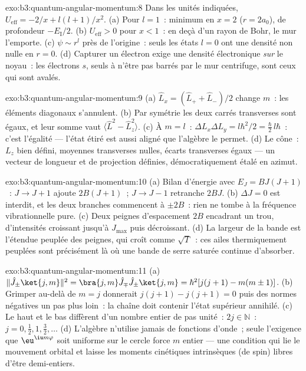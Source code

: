 \begin{solution}{exo:b3:quantum-angular-momentum:8}
Dans les unités indiquées, $U_{\text{eff}} = -2/x + l(l+1)/x^2$. (a)
Pour $l = 1$~: minimum en $x = 2$ ($r = 2a_0$), de profondeur
$-E_{\text{I}}/2$. (b) $U_{\text{eff}} > 0$ pour $x < 1$~: en deçà
d'un rayon de Bohr, le mur l'emporte. (c) $\psi \sim r^l$ près de
l'origine~: seuls les états $l = 0$ ont une densité non nulle en
$r = 0$. (d) Capturer un électron exige une densité électronique
\emph{sur} le noyau~: les électrons $s$, seuls à n'être pas barrés par
le mur centrifuge, sont ceux qui sont avalés.
\end{solution}

\begin{solution}{exo:b3:quantum-angular-momentum:9}
(a) $\hat L_x = (\hat L_+ + \hat L_-)/2$ change $m$~: les éléments
diagonaux s'annulent. (b) Par symétrie les deux carrés transverses
sont égaux, et leur somme vaut $\langle\hat L^2 - \hat L_z^2\rangle$.
(c) À $m = l$~: $\Delta L_x\Delta L_y = l\hbar^2/2 = \tfrac\hbar2
\,l\hbar$~: c'est l'égalité --- l'état étiré est aussi aligné que
l'algèbre le permet. (d) Le cône~: $L_z$ bien défini, moyennes
transverses nulles, écarts transverses égaux --- un vecteur de
longueur et de projection définies, démocratiquement étalé en azimut.
\end{solution}

\begin{solution}{exo:b3:quantum-angular-momentum:10}
(a) Bilan d'énergie avec $E_J = BJ(J+1)$~: $J \to J + 1$ ajoute
$2B(J+1)$~; $J \to J - 1$ retranche $2BJ$. (b) $\Delta J = 0$ est
interdit, et les deux branches commencent à $\pm 2B$~: rien ne tombe
à la fréquence vibrationnelle pure. (c) Deux peignes d'espacement $2B$
encadrant un trou, d'intensités croissant jusqu'à $J_{\max}$ puis
décroissant. (d) La largeur de la bande est l'étendue peuplée des
peignes, qui croît comme $\sqrt{T}$~: ces ailes thermiquement peuplées
sont précisément là où une bande de serre saturée continue d'absorber.
\end{solution}

\begin{solution}{exo:b3:quantum-angular-momentum:11}
(a) $\|\hat J_\pm\ket{j,m}\|^2 = \bra{j,m}\hat J_\mp\hat J_\pm
\ket{j,m} = \hbar^2[j(j+1) - m(m\pm1)]$. (b) Grimper au-delà de $m = j$
donnerait $j(j+1) - j(j+1) = 0$ puis des normes négatives un pas plus
loin~: la chaîne doit contenir l'état supérieur annihilé. (c) Le haut
et le bas diffèrent d'un nombre entier de pas unité~: $2j \in
\mathbb N$~: $j = 0, \tfrac12, 1, \tfrac32, \dots$ (d) L'algèbre
n'utilise jamais de fonctions d'onde~; seule l'exigence que
$\eu^{\iu m\varphi}$ soit uniforme sur le cercle force $m$ entier ---
une condition qui lie le mouvement orbital et laisse les moments
cinétiques intrinsèques (de spin) libres d'être demi-entiers.
\end{solution}

